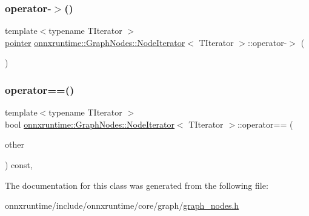 \subsubsection{\texorpdfstring{operator-\/$>$()}{operator->()}}
{\footnotesize\ttfamily template$<$typename T\+Iterator $>$ \\
\mbox{\hyperlink{classonnxruntime_1_1GraphNodes_1_1NodeIterator_a66c0579aa9dea456843a9017aeae3600}{pointer}} \mbox{\hyperlink{classonnxruntime_1_1GraphNodes_1_1NodeIterator}{onnxruntime\+::\+Graph\+Nodes\+::\+Node\+Iterator}}$<$ T\+Iterator $>$\+::operator-\/$>$ (\begin{DoxyParamCaption}{ }\end{DoxyParamCaption})\hspace{0.3cm}{\ttfamily [inline]}}

\mbox{\label{classonnxruntime_1_1GraphNodes_1_1NodeIterator_a6223f57dd3c6ccda92a9961f2e70a1a9}} 
\subsubsection{\texorpdfstring{operator==()}{operator==()}}
{\footnotesize\ttfamily template$<$typename T\+Iterator $>$ \\
bool \mbox{\hyperlink{classonnxruntime_1_1GraphNodes_1_1NodeIterator}{onnxruntime\+::\+Graph\+Nodes\+::\+Node\+Iterator}}$<$ T\+Iterator $>$\+::operator== (\begin{DoxyParamCaption}\item[{const \mbox{\hyperlink{classonnxruntime_1_1GraphNodes_1_1NodeIterator}{Node\+Iterator}}$<$ T\+Iterator $>$ \&}]{other }\end{DoxyParamCaption}) const\hspace{0.3cm}{\ttfamily [inline]}, {\ttfamily [noexcept]}}



The documentation for this class was generated from the following file\+:\begin{DoxyCompactItemize}
\item 
onnxruntime/include/onnxruntime/core/graph/\mbox{\hyperlink{graph__nodes_8h}{graph\+\_\+nodes.\+h}}\end{DoxyCompactItemize}
